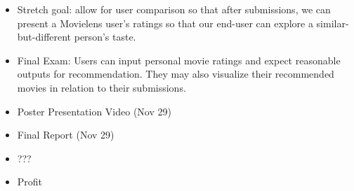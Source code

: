 \begin{itemize}
  \item Stretch goal: allow for user comparison so that after submissions, we can present a Movielens user's ratings so that our end-user can explore a similar-but-different person's taste.
  \item Final Exam: Users can input personal movie ratings and expect reasonable outputs for recommendation. They may also visualize their recommended movies in relation to their submissions.
  \item Poster Presentation Video (Nov 29)
  \item Final Report (Nov 29)
  \item ???
  \item Profit
\end{itemize}
